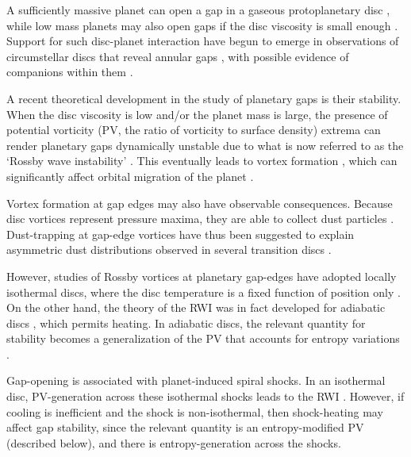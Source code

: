 \documentclass[useAMS,usenatbib]{mn2e}
\begin{document}
A sufficiently massive planet can open a gap in a 
gaseous protoplanetary disc \citep{pap_lin84,bryden99,crida06,fung14}, 
while low mass planets may also open gaps if the disc viscosity is
small enough \citep{li09,dong11,duffell13}. Support for such disc-planet
interaction have begun to emerge in observations of circumstellar
discs that reveal annular gaps
\citep[e.g.][]{quanz13a,debes13,osorio14}, with possible evidence of
companions within them \citep[e.g.][]{quanz13b,reggiani14}. 


A recent theoretical development in the study of planetary gaps is
their stability. When the disc viscosity is low and/or the planet mass
is large, the presence of potential vorticity (PV, the ratio of
vorticity to surface density) extrema can render planetary gaps
dynamically unstable due to what is now referred to as the `Rossby
wave instability' \citep[RWI,][]{lovelace99,li00}. This 
eventually leads to vortex formation 
\citep{li01,koller03,li05,valborro07}, which can significantly affect
orbital migration of the planet  \citep{ou07,li09,yu10,lin10}. 

Vortex formation at gap edges may also have observable 
consequences. Because disc vortices represent pressure maxima, they are
able to collect dust particles 
\citep{barge95,inaba06,lyra13}. Dust-trapping at gap-edge vortices
have thus been suggested to explain asymmetric dust
distributions observed in several transition discs
\citep[e.g.][]{casassus13,marel13,isella13,fukagawa13,perez14,pinilla15}. 

However, studies of Rossby vortices at planetary gap-edges have 
adopted locally isothermal discs, %
where the disc temperature is a fixed function of
position only \citep[e.g.][]{lyra08,lin11a,zhu14,fu14}. 
On the other hand, the theory of the RWI was in fact
developed for adiabatic discs \citep{li00}, which permits
heating. %
In adiabatic discs, the relevant quantity for stability
becomes a generalization of the PV that accounts for entropy variations
\citep{lovelace99}.   


Gap-opening is associated with planet-induced spiral shocks. In an
isothermal disc, PV-generation across these isothermal shocks leads to
the RWI \citep{koller03,li05,valborro07,lin10}.    
However, if cooling is inefficient and the shock is non-isothermal,
then shock-heating may affect gap stability, since the
relevant quantity is an entropy-modified PV (described below), and
there is entropy-generation across the shocks. 
\end{document}
